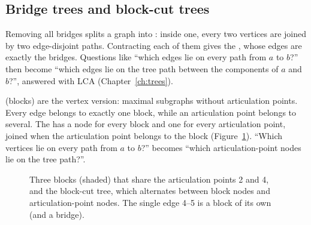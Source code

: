 
\subsection{Bridge trees and block-cut trees}

Removing all bridges splits a graph into : inside one, every two vertices are joined by two
edge-disjoint paths. Contracting each of them gives the , whose edges are exactly the bridges. Questions like
``which edges lie on every path from $a$ to $b$?'' then become ``which edges lie on the tree path between the components of $a$ and
$b$?'', answered with LCA (Chapter~\ref{ch:trees}).

 (blocks) are the vertex version: maximal subgraphs without articulation points. Every edge belongs
to exactly one block, while an articulation point belongs to several. The  has a node for every block and
one for every articulation point, joined when the articulation point belongs to the block (Figure~\ref{fig:blockcut}). ``Which
vertices lie on every path from $a$ to $b$?'' becomes ``which articulation-point nodes lie on the tree path?''.

\begin{figure}[htbp]
\centering
{}
\caption{Three blocks (shaded) that share the articulation points 2 and 4, and the block-cut tree, which alternates between
block nodes and articulation-point nodes. The single edge 4--5 is a block of its own (and a bridge).}
\label{fig:blockcut}
\end{figure}

